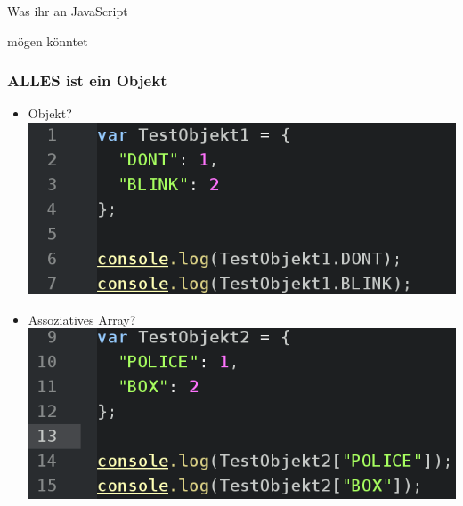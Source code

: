 \documentclass{beamer}
\begin{document}

\begin{frame}
\Huge{
\centerline{Was ihr an JavaScript}
\centerline{mögen könntet}
}
\end{frame}


\begin{frame}
\frametitle{ALLES ist ein Objekt}
\begin{itemize}
\item Objekt?
\\
\includegraphics[scale=0.3]{assets/everyobject_object.png}
\item Assoziatives Array?
\includegraphics[scale=0.3]{assets/everyobject_asarray.png}
\end{itemize}
\end{frame}

\end{document}
